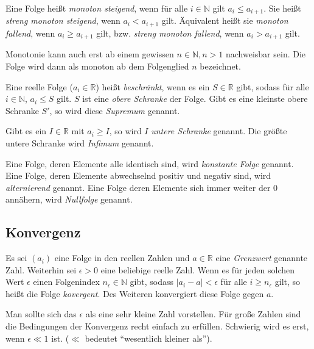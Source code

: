 \begin{definition}
Eine Folge heißt \textsl{monoton steigend}, wenn für alle $i\in \mathbb{N}$ gilt $a_i\le a_{i+1}$. Sie heißt \textsl{streng monoton steigend}, wenn $a_i < a_{i+1}$ gilt. Äquivalent heißt sie \textsl{monoton fallend}, wenn $a_i\ge a_{i+1}$ gilt, bzw. \textsl{streng monoton fallend}, wenn $a_i > a_{i+1}$ gilt.
\end{definition}

Monotonie kann auch erst ab einem gewissen $n\in \mathbb{N}, n>1$ nachweisbar sein. Die Folge wird dann als monoton ab dem Folgenglied $n$ bezeichnet.

\begin{definition}
Eine reelle Folge ($a_i \in \mathbb{R}$) heißt \textsl{beschränkt}, wenn es ein $S\in \mathbb{R}$ gibt, sodass für alle $i\in \mathbb{N}$, $a_i \le S$ gilt. $S$ ist eine \textsl{obere Schranke} der Folge. Gibt es eine kleinste obere Schranke $S'$, so wird diese \textsl{Supremum} genannt. 

Gibt es ein $I\in \mathbb{R}$ mit $a_i \ge I$, so wird $I$ \textsl{untere Schranke} genannt. Die größte untere Schranke wird \textsl{Infimum} genannt.
\end{definition}

\begin{definition}
Eine Folge, deren Elemente alle identisch sind, wird \textsl{konstante Folge} genannt. Eine Folge, deren Elemente abwechselnd positiv und negativ sind, wird \textsl{alternierend} genannt. Eine Folge deren Elemente sich immer weiter der 0 annähern, wird \textsl{Nullfolge} genannt.
\end{definition}

\subsection{Konvergenz}

\begin{definition}\label{def:lim}
Es sei $(a_i)$ eine Folge in den reellen Zahlen und $a\in \mathbb{R}$ eine \textsl{Grenzwert} genannte Zahl. Weiterhin sei $\epsilon>0$ eine beliebige reelle Zahl. Wenn es für jeden solchen Wert $\epsilon$ einen Folgenindex $n_\epsilon \in \mathbb{N}$ gibt, sodass $\vert a_i -a\vert <\epsilon$ für alle $i\ge n_\epsilon$ gilt, so heißt die Folge \textsl{kovergent}. Des Weiteren konvergiert diese Folge gegen $a$. 
\end{definition}

Man sollte sich das $\epsilon$ als eine sehr kleine Zahl vorstellen. Für große Zahlen sind die Bedingungen der Konvergenz recht einfach zu erfüllen. Schwierig wird es erst, wenn $\epsilon\ll 1$ ist. ($\ll$ bedeutet "`wesentlich kleiner als"').

